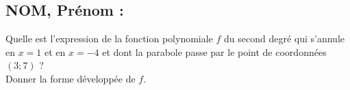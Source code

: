 \documentclass[a4paper,11pt,exos]{nsi} %
\begin{document}


\subsection*{NOM, Prénom : \dotfill} 

\maketitle


\begin{exercice}
    Quelle est l'expression de la fonction polynomiale $f$ du second degré qui s'annule en $x=1$ et en $x=-4$ et dont la parabole passe par le point de coordonnées $(3;7)$ ?\\
    Donner la forme développée de $f$.

    
\end{exercice}



\end{document}
